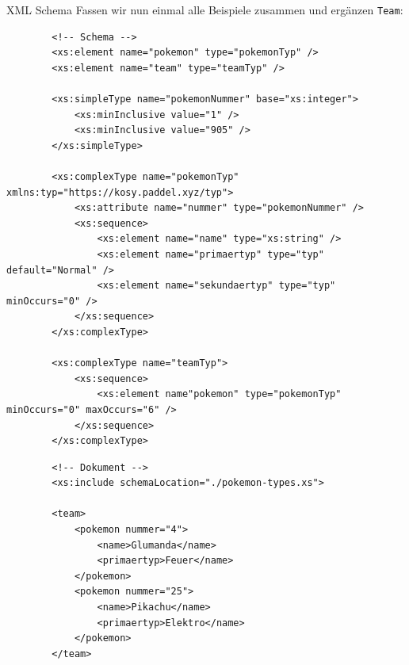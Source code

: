 \begin{example}{XML Schema}
    Fassen wir nun einmal alle Beispiele zusammen und ergänzen \texttt{Team}:

    \begin{lstlisting}
        <!-- Schema -->
        <xs:element name="pokemon" type="pokemonTyp" />
        <xs:element name="team" type="teamTyp" />

        <xs:simpleType name="pokemonNummer" base="xs:integer">
            <xs:minInclusive value="1" />
            <xs:minInclusive value="905" />
        </xs:simpleType>

        <xs:complexType name="pokemonTyp" xmlns:typ="https://kosy.paddel.xyz/typ">
            <xs:attribute name="nummer" type="pokemonNummer" />
            <xs:sequence>
                <xs:element name="name" type="xs:string" />
                <xs:element name="primaertyp" type="typ" default="Normal" />
                <xs:element name="sekundaertyp" type="typ" minOccurs="0" />
            </xs:sequence>
        </xs:complexType>

        <xs:complexType name="teamTyp">
            <xs:sequence>
                <xs:element name"pokemon" type="pokemonTyp" minOccurs="0" maxOccurs="6" />
            </xs:sequence>
        </xs:complexType>
    \end{lstlisting}

    \begin{lstlisting}
        <!-- Dokument -->
        <xs:include schemaLocation="./pokemon-types.xs">

        <team>
            <pokemon nummer="4">
                <name>Glumanda</name>
                <primaertyp>Feuer</name>
            </pokemon>
            <pokemon nummer="25">
                <name>Pikachu</name>
                <primaertyp>Elektro</name>
            </pokemon>
        </team>
    \end{lstlisting}
\end{example}

